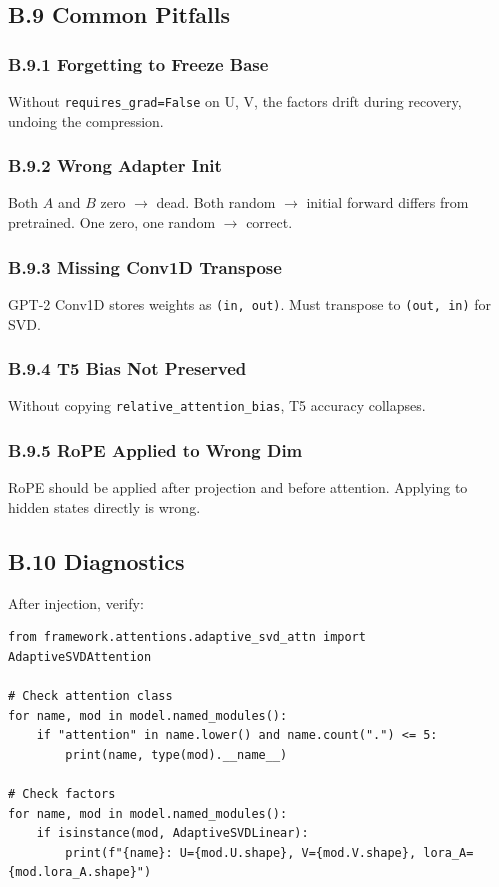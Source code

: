 \subsection{B.9 Common Pitfalls}

\subsubsection{B.9.1 Forgetting to Freeze Base}

Without \texttt{requires\_grad=False} on U, V, the factors drift during recovery, 
undoing the compression.

\subsubsection{B.9.2 Wrong Adapter Init}

Both $A$ and $B$ zero $\to$ dead. Both random $\to$ initial forward differs from 
pretrained. One zero, one random $\to$ correct.

\subsubsection{B.9.3 Missing Conv1D Transpose}

GPT-2 Conv1D stores weights as \texttt{(in, out)}. Must transpose to \texttt{(out, in)} 
for SVD.

\subsubsection{B.9.4 T5 Bias Not Preserved}

Without copying \texttt{relative\_attention\_bias}, T5 accuracy collapses.

\subsubsection{B.9.5 RoPE Applied to Wrong Dim}

RoPE should be applied after projection and before attention. Applying to 
hidden states directly is wrong.

\subsection{B.10 Diagnostics}

After injection, verify:

\begin{lstlisting}
from framework.attentions.adaptive_svd_attn import AdaptiveSVDAttention

# Check attention class
for name, mod in model.named_modules():
    if "attention" in name.lower() and name.count(".") <= 5:
        print(name, type(mod).__name__)

# Check factors
for name, mod in model.named_modules():
    if isinstance(mod, AdaptiveSVDLinear):
        print(f"{name}: U={mod.U.shape}, V={mod.V.shape}, lora_A={mod.lora_A.shape}")
\end{lstlisting}

